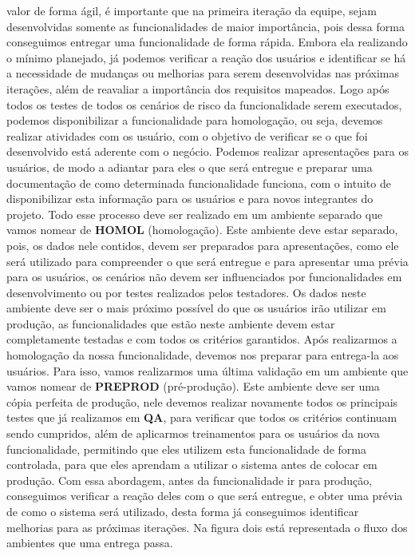       valor de forma ágil, é importante que na primeira iteração da equipe, sejam
      desenvolvidas somente as funcionalidades de maior importância, pois dessa
      forma conseguimos entregar uma funcionalidade de forma rápida. Embora ela
      realizando o mínimo planejado, já podemos verificar a reação dos usuários e
      identificar se há a necessidade de mudanças ou melhorias para serem desenvolvidas
      nas próximas iterações, além de reavaliar a importância dos requisitos mapeados.
      \newline
      Logo após todos os testes de todos os cenários de risco da funcionalidade
      serem executados, podemos disponibilizar a funcionalidade para homologação,
      ou seja, devemos realizar atividades com os usuário, com o objetivo de verificar
      se o que foi desenvolvido está aderente com o negócio. Podemos realizar
      apresentações para os usuários, de modo a adiantar para eles o que será
      entregue e preparar uma documentação de como determinada funcionalidade
      funciona, com o intuito de disponibilizar esta informação para os usuários e
      para novos integrantes do projeto. Todo esse processo deve ser realizado em
      um ambiente separado que vamos nomear de \textbf{HOMOL} (homologação).
      Este ambiente deve estar separado, pois, os dados nele contidos, devem ser
      preparados para apresentações, como ele será utilizado para compreender o
      que será entregue e para apresentar uma prévia para os usuários, os cenários
      não devem ser influenciados por funcionalidades em desenvolvimento ou por
      testes realizados pelos testadores. Os dados neste ambiente deve ser o mais
      próximo possível do que os usuários irão utilizar em produção, as funcionalidades
      que estão neste ambiente devem estar completamente testadas e com todos os
      critérios garantidos. \newline
      Após realizarmos a homologação da nossa funcionalidade, devemos nos preparar
      para entrega-la aos usuários. Para isso, vamos realizarmos uma última validação
      em um ambiente que vamos nomear de \textbf{PREPROD} (pré-produção). Este
      ambiente deve ser uma cópia perfeita de produção, nele devemos realizar novamente
      todos os principais testes que já realizamos em \textbf{QA}, para verificar
      que todos os critérios continuam sendo cumpridos, além de aplicarmos treinamentos
      para os usuários da nova funcionalidade, permitindo que eles utilizem esta
      funcionalidade de forma controlada, para que eles aprendam a utilizar o
      sistema antes de colocar em produção. Com essa abordagem, antes da funcionalidade
      ir para produção, conseguimos verificar a reação deles com o que será entregue,
      e obter uma prévia de como o sistema será utilizado, desta forma já conseguimos
      identificar melhorias para as próximas iterações. Na figura dois está
      representada o fluxo dos ambientes que uma entrega passa. \newline

